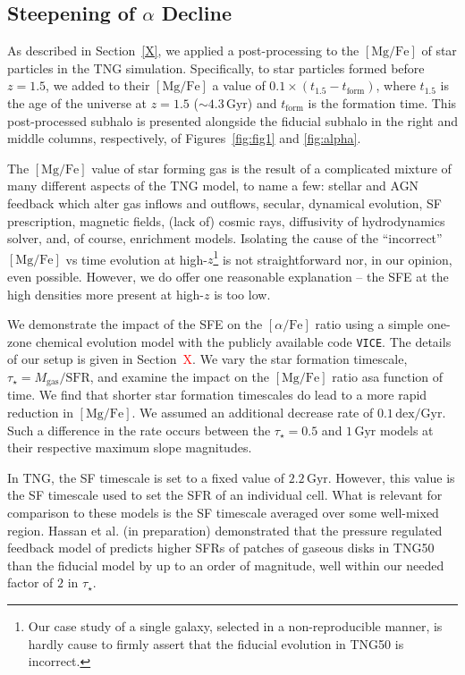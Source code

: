 \documentclass[linenumbers, twocolumn]{aastex631}
\newcommand{\Gyr}{\ensuremath{\textrm{Gyr}}}
\newcommand{\MgFe}{\ensuremath{[\textrm{Mg}/\textrm{Fe}]}}
\newcommand{\alphaFe}{\ensuremath{[\alpha/\textrm{Fe}]}}
\newcommand{\dex}{\ensuremath{\textrm{dex}}}
\newcommand{\red}[1]{\textcolor{red}{#1}}
\begin{document}
\subsection{Steepening of $\alpha$ Decline}\label{ssec:sfe}
As described in Section~\ref{X}, we applied a post-processing to the \MgFe{} of star particles in the TNG simulation. Specifically, to star particles formed before $z=1.5$, we added to their \MgFe{} a value of $0.1\times\left(t_{1.5}-t_{\textrm{form}}\right)$, where $t_{1.5}$ is the age of the universe at $z=1.5$ ($\sim4.3\,\Gyr$) and $t_{\textrm{form}}$ is the formation time. This post-processed subhalo is presented alongside the fiducial subhalo in the right and middle columns, respectively, of Figures~\ref{fig:fig1} and \ref{fig:alpha}.

The \MgFe{} value of star forming gas is the result of a complicated mixture of many different aspects of the TNG model, to name a few: stellar and AGN feedback which alter gas inflows and outflows, secular, dynamical evolution, SF prescription, magnetic fields, (lack of) cosmic rays, diffusivity of hydrodynamics solver, and, of course, enrichment models. Isolating the cause of the ``incorrect'' \MgFe{} vs time evolution at high-$z$\footnote{Our case study of a single galaxy, selected in a non-reproducible manner, is hardly cause to firmly assert that the fiducial evolution in TNG50 is incorrect.} is not straightforward nor, in our opinion, even possible. However, we do offer one reasonable explanation -- the SFE at the high densities more present at high-$z$ is too low.

We demonstrate the impact of the SFE on the \alphaFe{} ratio using a simple one-zone chemical evolution model with the publicly available code \texttt{VICE}. The details of our setup is given in Section~\red{X}. We vary the star formation timescale, $\tau_{\star}=M_{\textrm{gas}}/\textrm{SFR}$, and examine the impact on the \MgFe{} ratio asa function of time. We find that shorter star formation timescales do lead to a more rapid reduction in \MgFe{}. We assumed an additional decrease rate of $0.1\,\dex/\Gyr$. Such a difference in the rate occurs between the $\tau_{\star}=0.5$ and $1\,\Gyr$ models at their respective maximum slope magnitudes.

In TNG, the SF timescale is set to a fixed value of $2.2\,\Gyr$. However, this value is the SF timescale used to set the SFR of an individual cell. What is relevant for comparison to these models is the SF timescale averaged over some well-mixed region. Hassan et al. (in preparation) demonstrated that the pressure regulated feedback model of \citet{2022ApJ...936..137O} predicts higher SFRs of patches of gaseous disks in TNG50 than the fiducial model by up to an order of magnitude, well within our needed factor of $2$ in $\tau_{\star}$.
\end{document}
